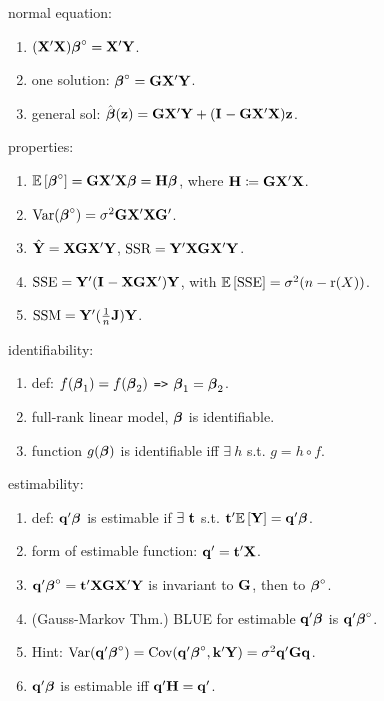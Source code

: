 normal equation: \begin{enumerate}
    \item $(\bX'\bX) \bbeta^\circ = \bX'\bY$.
    \item one solution: $\bbeta^\circ = \bG\bX'\bY$.
    \item general sol: $\hbbeta(\bz) = \bG\bX'\bY + (\bI{} - \bG\bX'\bX)\bz$.
\end{enumerate}

properties: \begin{enumerate}
    \item $\bE{\bbeta^\circ} =\bG \bX'\bX \bbeta = \bH \bbeta$, where $\bH \coloneqq \bG \bX'\bX$.
    \item $\var{\bbeta^\circ} = \sigma^2 \bG \bX'\bX \bG'$.
    \item $\hat{\bY} = \bX\bG\bX' \bY$, $\text{SSR} = \bY' \bX\bG\bX' \bY$.
    \item $\text{SSE} = \bY' (\bI{} - \bX\bG\bX') \bY$, with $\bE{\text{SSE}} = \sigma^2(n - \rk{X})$.
    \item $\text{SSM} = \bY' (\frac{1}{n} \bJ )\bY$.
\end{enumerate}
 
identifiability: \begin{enumerate}
    \item def: $f(\bbeta_1) = f(\bbeta_2)$ \verb|=>| $\bbeta_1 = \bbeta_2$.
    \item full-rank linear model, $\bbeta$ is identifiable.
    \item function $g(\bbeta)$ is identifiable iff $\exists\ h$ s.t. $g = h \circ f$.
\end{enumerate}

estimability: \begin{enumerate}
    \item def: $\bq'\bbeta$ is estimable if $\exists\ \bt$ s.t. $\bt'\bE{\bY} = \bq'\bbeta$.
    \item form of estimable function: $\bq' = \bt' \bX$.
    \item $\bq'\bbeta^\circ = \bt'\bX\bG\bX'\bY$ is invariant to $\bG$, then to $\bbeta^\circ$.
    \item (Gauss-Markov Thm.) BLUE for estimable $\bq'\bbeta$ is $\bq'\bbeta^\circ$.
    \item [] Hint: $\var{\bq'\bbeta^\circ} = \cov{\bq'\bbeta^\circ}{\bk'\bY} = \sigma^2 \bq'\bG\bq$.
    \item $\bq'\bbeta$ is estimable iff $\bq' \bH = \bq'$.
\end{enumerate}

